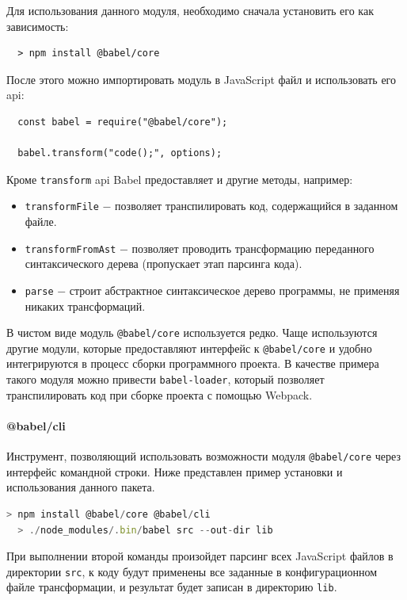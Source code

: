 \documentclass[14pt, a4paper]{article}
\def\code#1{\texttt{#1}} %
\begin{document}
Для использования данного модуля, необходимо сначала установить его как зависимость:
\begin{lstlisting}
  > npm install @babel/core
\end{lstlisting}
После этого можно импортировать модуль в JavaScript файл и использовать его api:
\begin{lstlisting}
  const babel = require("@babel/core");

  babel.transform("code();", options);
\end{lstlisting}
Кроме \code{transform} api Babel предоставляет и другие методы, например:
\begin{itemize}
  \item \code{transformFile} $-$ позволяет транспилировать код, содержащийся в заданном файле.
  \item \code{transformFromAst} $-$ позволяет проводить трансформацию переданного синтаксического дерева
        (пропускает этап парсинга кода).
  \item \code{parse} $-$ строит абстрактное синтаксическое дерево программы, не применяя никаких
        трансформаций.
\end{itemize}

В чистом виде модуль \code{@babel/core} используется редко. Чаще используются другие
модули, которые предоставляют интерфейс к \code{@babel/core} и удобно интегрируются в процесс сборки
программного проекта. В качестве примера такого модуля можно привести \code{babel-loader}, который
позволяет транспилировать код при сборке проекта с помощью Webpack.

\paragraph{@babel/cli} \mbox{}

Инструмент, позволяющий использовать возможности модуля \linebreak \code{@babel/core} через интерфейс
командной строки. Ниже представлен пример установки и использования данного пакета.
\begin{lstlisting}[language=JavaScript]
  > npm install @babel/core @babel/cli
  > ./node_modules/.bin/babel src --out-dir lib
\end{lstlisting}

При выполнении второй команды произойдет парсинг всех JavaScript файлов в директории \code{src},
к коду будут применены все заданные в конфигурационном файле трансформации, и результат будет записан
в директорию \code{lib}.
\end{document}
